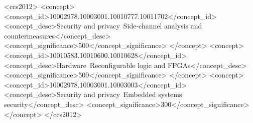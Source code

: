 \documentclass[manuscript,screen]{acmart}
\begin{document}




\begin{CCSXML}
<ccs2012>
   <concept>
       <concept_id>10002978.10003001.10010777.10011702</concept_id>
       <concept_desc>Security and privacy~Side-channel analysis and countermeasures</concept_desc>
       <concept_significance>500</concept_significance>
       </concept>
   <concept>
       <concept_id>10010583.10010600.10010628</concept_id>
       <concept_desc>Hardware~Reconfigurable logic and FPGAs</concept_desc>
       <concept_significance>500</concept_significance>
       </concept>
   <concept>
       <concept_id>10002978.10003001.10003003</concept_id>
       <concept_desc>Security and privacy~Embedded systems security</concept_desc>
       <concept_significance>300</concept_significance>
       </concept>
 </ccs2012>
\end{CCSXML}




\maketitle
    
    
    
    
    
    
    
    
    
    
    
    
    
    
    
    
\end{document}

